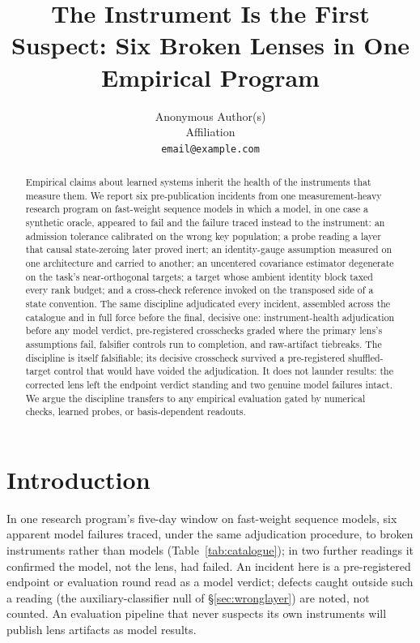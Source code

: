 \documentclass{article}
\title{The Instrument Is the First Suspect: Six Broken Lenses in One
Empirical Program}
\author{
  Anonymous Author(s)\\
  Affiliation\\
  \texttt{email@example.com}
}
\begin{document}
\maketitle

\begin{abstract}
Empirical claims about learned systems inherit the health of the
instruments that measure them. We report six pre-publication incidents from one
measurement-heavy research program
on fast-weight sequence models in which a model, in one case a
synthetic oracle, appeared to
fail and the failure traced instead to the instrument: an admission
tolerance calibrated on the wrong key population; a probe reading a
layer that causal state-zeroing later proved inert; an identity-gauge
assumption measured on one architecture and carried to another; an
uncentered covariance estimator degenerate on the task's
near-orthogonal targets; a target whose ambient identity block taxed
every rank budget; and a cross-check reference invoked on the
transposed side of a state convention. The same discipline adjudicated every incident,
assembled across the catalogue and in full force before the final,
decisive one:
instrument-health adjudication before any model verdict,
pre-registered crosschecks graded where the primary lens's assumptions
fail, falsifier controls run to completion, and raw-artifact
tiebreaks. The discipline is itself falsifiable; its decisive
crosscheck survived a pre-registered shuffled-target control that
would have voided the adjudication. It does not launder results: the
corrected lens left the endpoint verdict standing and
two genuine model failures intact. We argue the discipline transfers
to any empirical evaluation gated by numerical checks, learned probes,
or basis-dependent readouts.
\end{abstract}


\section{Introduction}
\label{sec:intro}

 In one research program's five-day window on fast-weight sequence
models, six apparent model failures traced, under the same
adjudication procedure, to broken instruments rather than models
(Table~\ref{tab:catalogue}); in two further readings it confirmed
the model, not the lens, had failed. An incident
here is a pre-registered endpoint or evaluation round read as a model
verdict; defects caught outside such a reading (the
auxiliary-classifier null of \S\ref{sec:wronglayer}) are noted, not
counted. An evaluation pipeline that never suspects its own
instruments will publish lens artifacts as model results.
\end{document}
